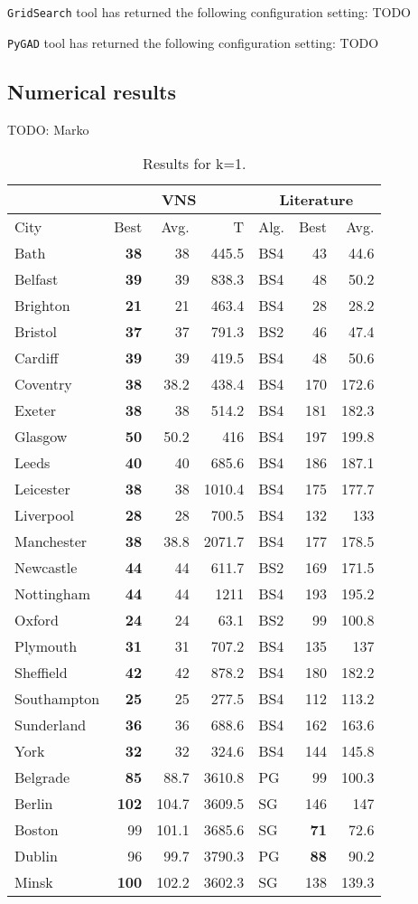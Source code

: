 \documentclass[dvipsnames,format=sigconf,anonymous=true,review=true]{acmart}
\begin{document}
    \texttt{GridSearch} tool has returned the following configuration setting: TODO
    
     \texttt{PyGAD} tool has returned the following configuration setting: TODO
\subsection{Numerical results }
 TODO: Marko
 
  \begin{table}
 	\begin{tabular}{l|rrr|lrr}
 	\hline
 	\multicolumn{1}{c}{ } & \multicolumn{3}{|c}{VNS} & \multicolumn{3}{|c}{Literature} \\
 	\hline
	City & Best & Avg. & T
	 & Alg. & Best & Avg. \\ \hline
	Bath&\bf{38}&38&445.5&BS4&43&44.6\\
	Belfast&\bf{39}&39&838.3&BS4&48&50.2\\
	Brighton&\bf{21}&21&463.4&BS4&28&28.2\\
	Bristol&\bf{37}&37&791.3&BS2&46&47.4\\
	Cardiff&\bf{39}&39&419.5&BS4&48&50.6\\
	Coventry&\bf{38}&38.2&438.4&BS4&170&172.6\\
	Exeter&\bf{38}&38&514.2&BS4&181&182.3\\
	Glasgow&\bf{50}&50.2&416&BS4&197&199.8\\
	Leeds&\bf{40}&40&685.6&BS4&186&187.1\\
	Leicester&\bf{38}&38&1010.4&BS4&175&177.7\\
	Liverpool&\bf{28}&28&700.5&BS4&132&133\\
	Manchester&\bf{38}&38.8&2071.7&BS4&177&178.5\\
	Newcastle&\bf{44}&44&611.7&BS2&169&171.5\\
	Nottingham&\bf{44}&44&1211&BS4&193&195.2\\
	Oxford&\bf{24}&24&63.1&BS2&99&100.8\\
	Plymouth&\bf{31}&31&707.2&BS4&135&137\\
	Sheffield&\bf{42}&42&878.2&BS4&180&182.2\\
	Southampton&\bf{25}&25&277.5&BS4&112&113.2\\
	Sunderland&\bf{36}&36&688.6&BS4&162&163.6\\
	York&\bf{32}&32&324.6&BS4&144&145.8\\
	Belgrade&\bf{85}&88.7&3610.8&PG&99&100.3\\
	Berlin&\bf{102}&104.7&3609.5&SG&146&147\\
	Boston&99&101.1&3685.6&SG&\bf{71}&72.6\\
	Dublin&96&99.7&3790.3&PG&\bf{88}&90.2\\
	Minsk&\bf{100}&102.2&3602.3&SG&138&139.3\\
	
	\hline
	
 	\end{tabular}
 	\caption{Results for k=1.}
 	\label{tab:k1}  
 \end{table}
\end{document}
